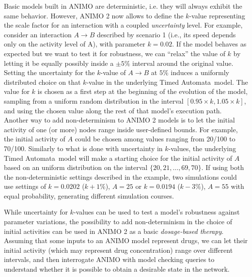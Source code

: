 \documentclass{bmcart}
\def\tas{Timed Automata}
\def\animo2{ANIMO 2}
\begin{document}
Basic models built in ANIMO are deterministic, i.e. they will always exhibit the same behavior.
However, \animo2{} now allows to define the $k$-value representing the scale factor for an interaction
with a coupled \emph{uncertainty} level. For example, consider an interaction $A \rightarrow B$ described
by scenario 1 (i.e., its speed depends only on the activity level of A), with parameter $k = 0.02$. If the model
behaves as expected but we want to test it for robustness, we can ``relax'' the value of $k$ by letting
it be equally possibly inside a $\pm 5\%$ interval around the original value. Setting the uncertainty for the $k$-value
of $A \rightarrow B$ at $5 \%$ induces a uniformly distributed choice on that $k$-value in the underlying \tas\ model.
The value for $k$ is chosen as a first step at the beginning of the evolution of the model,
sampling from a uniform random distribution in the interval $[0.95 \times k, 1.05 \times k]$, and using the chosen value
along the rest of that model's execution path. Another way to add non-determinism to \animo2{} models is to
let the initial activity of one (or more) nodes range inside user-defined bounds. For example, the initial activity of $A$
could be chosen among values ranging from 20/100 to 70/100. Similarly to what is done with uncertainty in $k$-values,
the underlying \tas\ model will make a starting choice for the initial activity of $A$ based on an uniform distribution
on the interval $\{ 20, 21, \dots, 69, 70\}$. If using both the non-deterministic settings described in the example,
two simulations could use settings of $k = 0.0202$ ($k + 1\%$), $A = 25$ or $k = 0.0194$ ($k - 3\%$),
$A = 55$ with equal probability, generating different simulation courses.

While uncertainty for $k$-values can be
used to test a model's robustness against parameter variations, the possibility to add non-determinism in the choice of
initial activities can be used in \animo2{} as a basic \emph{dosage-based therapy}. Assuming that some inputs to an ANIMO model represent
drugs, we can let their initial activity (which may represent drug concentration) range over different intervals, and then interrogate ANIMO
with model checking queries to understand whether it is possible to obtain a desirable state in the network.
\end{document}

